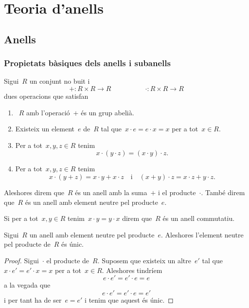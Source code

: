 \documentclass[../estructures-algebraiques.tex]{subfiles}
\begin{document}
\chapter{Teoria d'anells}
\section{Anells}
    \subsection{Propietats bàsiques dels anells i subanells}
    \begin{definition}[Anell]
        \label{def:anell}
        \label{def:anell-commutatiu}
        \label{def:anell-i-element-neutre-pel-producte}
        Sigui~\(R\) un conjunt no buit i
        \[
            +\colon R\times R\longrightarrow R\qquad\qquad\quad\cdot\colon R\times R\longrightarrow R
        \]
        dues operacions que satisfan
        \begin{enumerate}
            \item~\(R\) amb l'operació~\(+\) és un grup abelià.
            \item Existeix un element~\(e\) de~\(R\) tal que~\(x\cdot e=e\cdot x=x\) per a tot~\(x\in R\).
            \item Per a tot~\(x,y,z\in R\) tenim
            \[
                x\cdot(y\cdot z)=(x\cdot y)\cdot z.
            \]
            \item Per a tot~\(x,y,z\in R\) tenim
            \[
                x\cdot(y+z)=x\cdot y+x\cdot z\quad\text{i}\quad(x+y)\cdot z=x\cdot z+y\cdot z.
            \]
        \end{enumerate}
        Aleshores direm que~\(R\) és un anell amb la suma~\(+\) i el producte~\(\cdot\).
        També direm que~\(R\) és un anell amb element neutre pel producte~\(e\).

        Si per a tot~\(x,y\in R\) tenim~\(x\cdot y=y\cdot x\) direm que~\(R\) és un anell commutatiu.
    \end{definition}
    \begin{proposition}
        \label{prop:unicitat-neutre-del-producte-anell}
        Sigui~\(R\) un anell amb element neutre pel producte~\(e\).
        Aleshores l'element neutre pel producte de~\(R\) és únic.
    \end{proposition}
    \begin{proof}
        Sigui~\(\cdot\) el producte de~\(R\).
        Suposem que existeix un altre~\(e'\) tal que~\(x\cdot e'=e'\cdot x=x\) per a tot~\(x\in R\).
        Aleshores tindríem
        \[
            e\cdot e'=e'\cdot e=e
        \]
        a la vegada que
        \[
            e\cdot e'=e'\cdot e=e'
        \]
        i per tant ha de ser~\(e=e'\) i tenim que aquest és únic.
    \end{proof}
\end{document}

